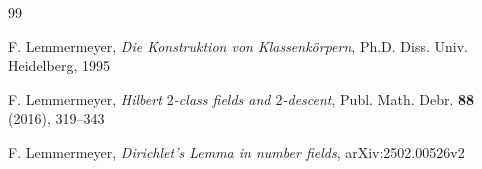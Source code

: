 \documentclass{amsart}
\begin{document}
\begin{thebibliography}{99}


 F. Lemmermeyer,
  {\em Die Konstruktion von Klassenk\"orpern},
  Ph.D. Diss. Univ. Heidelberg, 1995
 
 F. Lemmermeyer,
  {\em Hilbert $2$-class fields and $2$-descent},
  Publ. Math. Debr. {\bf 88} (2016), 319--343

 F. Lemmermeyer,
  {\em Dirichlet's Lemma in number fields},
  arXiv:2502.00526v2
  
\end{thebibliography}
\end{document}
